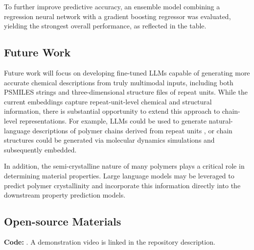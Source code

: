 To further improve predictive accuracy, an ensemble model combining a regression neural network with a gradient boosting regressor was evaluated, yielding the strongest overall performance, as reflected in the table.

\subsection*{Future Work}
Future work will focus on developing fine-tuned LLMs capable of generating more accurate chemical descriptions from truly multimodal inputs, including both PSMILES strings and three-dimensional structure files of repeat units. While the current embeddings capture repeat-unit-level chemical and structural information, there is substantial opportunity to extend this approach to chain-level representations. For example, LLMs could be used to generate natural-language descriptions of polymer chains derived from repeat units \cite{guo2021polygrammargrammardigitalpolymer}, or chain structures could be generated via molecular dynamics simulations and subsequently embedded.  

In addition, the semi-crystalline nature of many polymers plays a critical role in determining material properties. Large language models may be leveraged to predict polymer crystallinity and incorporate this information directly into the downstream property prediction models.

\subsection*{Open-source Materials}
\textbf{Code:} . A demonstration video is linked in the repository description.

%





